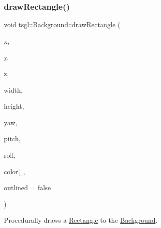 \subsubsection{\texorpdfstring{draw\+Rectangle()}{drawRectangle()}\hspace{0.1cm}{\footnotesize\ttfamily [2/2]}}
{\footnotesize\ttfamily void tsgl\+::\+Background\+::draw\+Rectangle (\begin{DoxyParamCaption}\item[{float}]{x,  }\item[{float}]{y,  }\item[{float}]{z,  }\item[{float}]{width,  }\item[{float}]{height,  }\item[{float}]{yaw,  }\item[{float}]{pitch,  }\item[{float}]{roll,  }\item[{\hyperlink{structtsgl_1_1_color_float}{Color\+Float}}]{color\mbox{[}$\,$\mbox{]},  }\item[{bool}]{outlined = {\ttfamily false} }\end{DoxyParamCaption})\hspace{0.3cm}{\ttfamily [virtual]}}



Procedurally draws a \hyperlink{classtsgl_1_1_rectangle}{Rectangle} to the \hyperlink{classtsgl_1_1_background}{Background}. 

